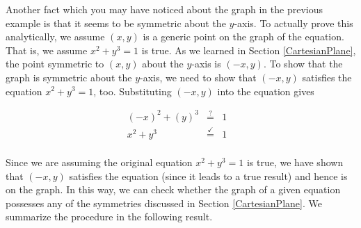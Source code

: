 \medskip

Another fact which you may have noticed about the graph in the previous example is that it seems to be symmetric about the $y$-axis.  To actually prove this analytically, we assume $(x,y)$ is a generic point on the graph of the equation. That is, we assume  $x^2 + y^3 = 1$ is true.  As we learned in Section \ref{CartesianPlane},  the point symmetric to $(x,y)$ about the $y$-axis is $(-x,y)$.  To show that the graph is symmetric about the $y$-axis, we need to show that $(-x,y)$ satisfies the equation $x^2 + y^3 = 1$, too.  Substituting $(-x,y)$ into the equation gives

\setlength{\extrarowheight}{2pt}

\[ \begin{array}{rclr}   
(-x)^2+(y)^3 & \stackrel{?}{=} & 1 & \\
   x^2 + y^3 & \stackrel{\checkmark}{=} & 1 & \\ 
   \end{array} \]

Since we are assuming the original equation $x^2 + y^3 = 1$ is true, we have shown that $(-x, y)$ satisfies the equation (since it leads to a true result) and hence is on the graph.  In this way, we can check whether the graph of a given equation possesses any of the symmetries discussed in Section \ref{CartesianPlane}.  We summarize the procedure in the following result.  

\medskip


